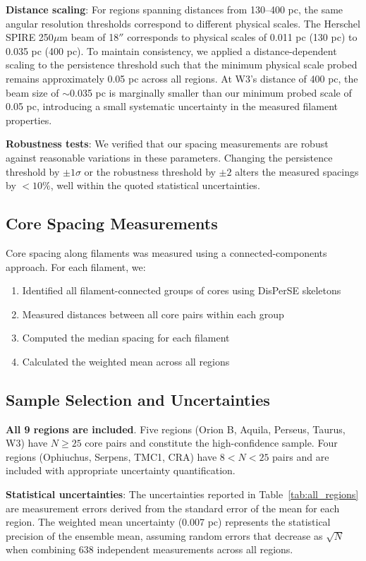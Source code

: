 \documentclass[11pt,a4paper]{article}
\begin{document}
\textbf{Distance scaling}: For regions spanning distances from 130--400 pc, the same angular resolution thresholds correspond to different physical scales. The Herschel SPIRE 250$\mu$m beam of 18$''$ corresponds to physical scales of 0.011 pc (130 pc) to 0.035 pc (400 pc). To maintain consistency, we applied a distance-dependent scaling to the persistence threshold such that the minimum physical scale probed remains approximately 0.05 pc across all regions. At W3's distance of 400 pc, the beam size of $\sim$0.035 pc is marginally smaller than our minimum probed scale of 0.05 pc, introducing a small systematic uncertainty in the measured filament properties.

\textbf{Robustness tests}: We verified that our spacing measurements are robust against reasonable variations in these parameters. Changing the persistence threshold by $\pm 1\sigma$ or the robustness threshold by $\pm 2$ alters the measured spacings by $<10\%$, well within the quoted statistical uncertainties.

\subsection{Core Spacing Measurements}

Core spacing along filaments was measured using a connected-components approach. For each filament, we:
\begin{enumerate}
    \item Identified all filament-connected groups of cores using DisPerSE skeletons
    \item Measured distances between all core pairs within each group
    \item Computed the median spacing for each filament
    \item Calculated the weighted mean across all regions
\end{enumerate}

\subsection{Sample Selection and Uncertainties}

\textbf{All 9 regions are included}. Five regions (Orion B, Aquila, Perseus, Taurus, W3) have $N \geq 25$ core pairs and constitute the high-confidence sample. Four regions (Ophiuchus, Serpens, TMC1, CRA) have $8 < N < 25$ pairs and are included with appropriate uncertainty quantification.

\textbf{Statistical uncertainties}: The uncertainties reported in Table~\ref{tab:all_regions} are measurement errors derived from the standard error of the mean for each region. The weighted mean uncertainty (0.007 pc) represents the statistical precision of the ensemble mean, assuming random errors that decrease as $\sqrt{N}$ when combining 638 independent measurements across all regions.
\end{document}
